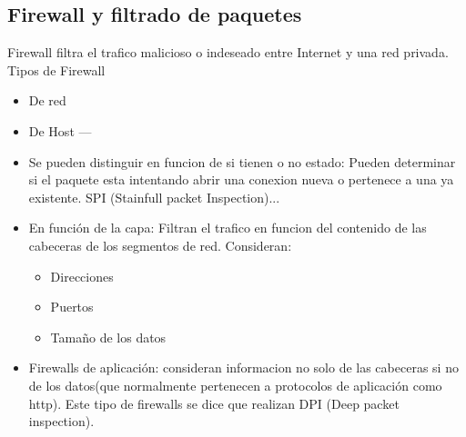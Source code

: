 \subsection{Firewall y filtrado de paquetes}
Firewall filtra el trafico malicioso o indeseado entre Internet y una red privada.
Tipos de Firewall
\begin{itemize}
    \item De red
    \item De Host
    ---
    \item Se pueden distinguir en funcion de si tienen o no estado: Pueden determinar si el paquete esta intentando abrir una conexion nueva o pertenece a una ya existente.
    SPI (Stainfull packet Inspection)...
    \item En función de la capa: Filtran el trafico en funcion del contenido de las cabeceras de los segmentos de red. Consideran:
    \begin{itemize}
        \item Direcciones
        \item Puertos   
        \item Tamaño de los datos
    \end{itemize}

    \item Firewalls de aplicación: consideran informacion no solo de las cabeceras si no de los datos(que normalmente pertenecen a protocolos de aplicación como http). Este tipo de firewalls se dice que realizan DPI (Deep packet inspection).
\end{itemize}

